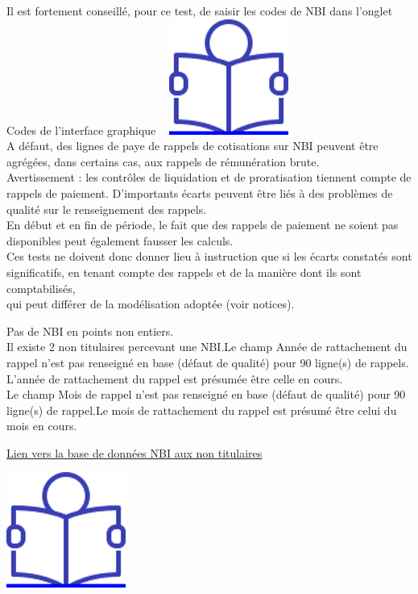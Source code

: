 Il est fortement conseillé, pour ce test, de saisir les codes de NBI
dans l'onglet Codes de l'interface graphique ~
\href{../Docs/Notices/fiche_onglet_codes.odt}{\includegraphics{icones/Notice.png}}\\
A défaut, des lignes de paye de rappels de cotisations sur NBI peuvent
être agrégées, dans certains cas, aux rappels de rémunération brute.\\
Avertissement : les contrôles de liquidation et de proratisation
tiennent compte de rappels de paiement. D'importants écarts peuvent être
liés à des problèmes de qualité sur le renseignement des rappels.\\
En début et en fin de période, le fait que des rappels de paiement ne
soient pas disponibles peut également fausser les calculs.\\
Ces tests ne doivent donc donner lieu à instruction que si les écarts
constatés sont significatifs, en tenant compte des rappels et de la
manière dont ils sont comptabilisés,\\
qui peut différer de la modélisation adoptée (voir notices).

Pas de NBI en points non entiers.\\
Il existe 2 non titulaires percevant une NBI.Le champ Année de
rattachement du rappel n'est pas renseigné en base (défaut de qualité)
pour 90 ligne(s) de rappels.\\
L'année de rattachement du rappel est présumée être celle en cours.\\
Le champ Mois de rappel n'est pas renseigné en base (défaut de qualité)
pour 90 ligne(s) de rappel.Le mois de rattachement du rappel est présumé
être celui du mois en cours.

\href{../Bases/Reglementation/NBI.aux.non.titulaires.csv}{Lien vers la base
de données NBI aux non titulaires}

\href{../Docs/Notices/fiche_NBI_nt.odt}{\includegraphics{icones/Notice.png}}

